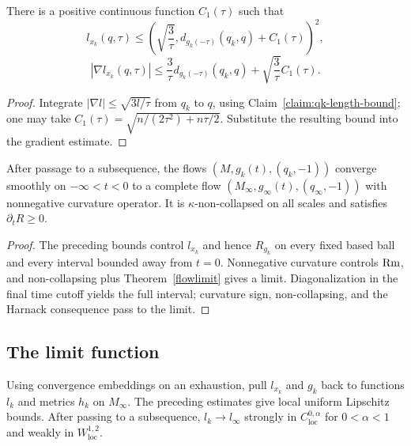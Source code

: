 \begin{corollary}\label{cor:l-function-distance-bound}
\label{lxkest}

There is a positive continuous function $C_1(\tau)$ such that
\[
 l_{x_k}(q,\tau)\leq
 \left(\sqrt{\frac3\tau},d_{g_k(-\tau)}(q_k,q)+C_1(\tau)\right)^2,
\]
\[
 |\nabla l_{x_k}(q,\tau)|\leq
 \frac3\tau d_{g_k(-\tau)}(q_k,q)+
 \sqrt{\frac3\tau}C_1(\tau).
\]
\end{corollary}
\begin{proof}
\sketch
{}
Integrate $|\nabla l|\leq\sqrt{3l/\tau}$ from $q_k$ to $q$, using
Claim~\ref{claim:qk-length-bound}; one may take
$C_1(\tau)=\sqrt{n/(2\tau^2)+n\tau/2}$. Substitute the resulting
bound into the gradient estimate.
\end{proof}

\begin{corollary}\label{cor:kappa-solution-geometric-limit-exists}

After passage to a subsequence, the flows
$(M,g_k(t),(q_k,-1))$ converge smoothly on $-\infty<t<0$ to a
complete flow $(M_\infty,g_\infty(t),(q_\infty,-1))$ with
nonnegative curvature operator. It is $\kappa$-non-collapsed on all
scales and satisfies $\partial_tR\geq0$.
\end{corollary}
\begin{proof}
\sketch The preceding bounds control $l_{x_k}$ and hence $R_{g_k}$
on every fixed based ball and every interval bounded away from
$t=0$. Nonnegative curvature controls $\operatorname{Rm}$, and non-collapsing plus
Theorem~\ref{flowlimit} gives a limit. Diagonalization in the final
time cutoff yields the full interval; curvature sign,
non-collapsing, and the Harnack consequence pass to the limit.
\end{proof}

\subsection{The limit function}

Using convergence embeddings on an exhaustion, pull $l_{x_k}$ and
$g_k$ back to functions $l_k$ and metrics $h_k$ on $M_\infty$.
The preceding estimates give local uniform Lipschitz bounds. After
passing to a subsequence, $l_k\to l_\infty$ strongly in
$C^{0,\alpha}_{\mathrm{loc}}$ for $0<\alpha<1$ and weakly in
$W^{1,2}_{\mathrm{loc}}$.

